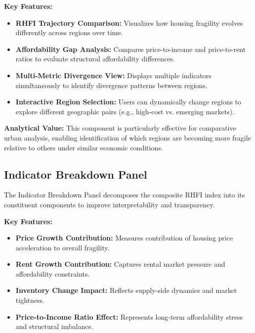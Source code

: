 \documentclass[11pt,twocolumn]{article}
\begin{document}
    \textbf{Key Features:}
    \begin{itemize}[leftmargin=1.2em]
        \item \textbf{RHFI Trajectory Comparison:} Visualizes how housing fragility evolves differently across regions over time.

        \item \textbf{Affordability Gap Analysis:} Compares price-to-income and price-to-rent ratios to evaluate structural affordability differences.

        \item \textbf{Multi-Metric Divergence View:} Displays multiple indicators simultaneously to identify divergence patterns between regions.

        \item \textbf{Interactive Region Selection:} Users can dynamically change regions to explore different geographic pairs (e.g., high-cost vs. emerging markets).
    \end{itemize}

    \textbf{Analytical Value:}
    This component is particularly effective for comparative urban analysis, enabling identification of which regions are becoming more fragile relative to others under similar economic conditions.

    \subsection{Indicator Breakdown Panel}

    The Indicator Breakdown Panel decomposes the composite RHFI index into its constituent components to improve interpretability and transparency.

    \textbf{Key Features:}
    \begin{itemize}[leftmargin=1.2em]
        \item \textbf{Price Growth Contribution:} Measures contribution of housing price acceleration to overall fragility.

        \item \textbf{Rent Growth Contribution:} Captures rental market pressure and affordability constraints.

        \item \textbf{Inventory Change Impact:} Reflects supply-side dynamics and market tightness.

        \item \textbf{Price-to-Income Ratio Effect:} Represents long-term affordability stress and structural imbalance.
    \end{itemize}
\end{document}
